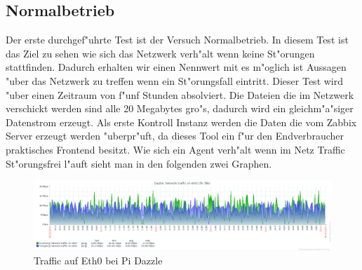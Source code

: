 \subsection{Normalbetrieb}
\label{subsec:normalbetrieb}
Der erste durchgef"uhrte Test ist der Versuch Normalbetrieb. In diesem Test ist das Ziel zu sehen wie %
sich das Netzwerk verh"alt wenn keine St"orungen stattfinden. Dadurch erhalten wir einen Nennwert mit es m"oglich ist %
Aussagen "uber das Netzwerk zu treffen wenn ein St"orungsfall eintritt. Dieser Test wird "uber einen Zeitraum von f"unf %
Stunden absolviert. Die Dateien die im Netzwerk verschickt werden sind alle 20 Megabytes gro"s, dadurch wird ein %
gleichm"a"siger Datenstrom erzeugt. Als erste Kontroll Instanz werden die Daten die vom Zabbix Server erzeugt werden %
"uberpr"uft, da dieses Tool ein f"ur den Endverbraucher praktisches Frontend besitzt. Wie sich ein Agent verh"alt %
wenn im Netz Traffic St"orungsfrei l"auft sieht man in den folgenden zwei Graphen.

\begin{figure}[htbp]
\centering
\includegraphics*[width=0.9\linewidth]{Abb/ZabbixDazzle/Standard/DazzleStandard}

\caption{Traffic auf Eth0 bei Pi Dazzle}
\label{fig:Eth0DazzleStandard}
\end{figure}

